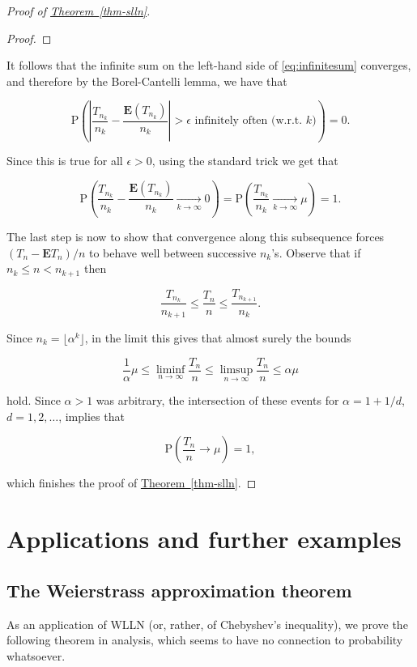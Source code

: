\documentclass[11pt]{report}
\theoremstyle{plain}
\theoremstyle{definition}
\begin{document}
\begin{proof}[Proof of \texorpdfstring{\hyperref[thm-slln]{Theorem~\ref*{thm-slln}}}{Theorem}]
\begin{proof}
\end{proof}

\noindent It follows that the infinite sum on the left-hand
side of \eqref{eq:infinitesum} converges, and therefore by
the Borel-Cantelli lemma, we have that

\[
\mathrm{P}\left(\left|\frac{T_{n_k}}{n_k} - \frac{\mathbf{E}(T_{n_k})}{n_k}\right| > \epsilon\textrm{ infinitely often (w.r.t. } k \textrm{)}\right)
=0.
\]

\noindent Since this is true for all $\epsilon>0$, using the
standard trick we get that

\[
\mathrm{P}\left(\frac{T_{n_k}}{n_k} - \frac{\mathbf{E}(T_{n_k})}{n_k}\xrightarrow[k\to\infty]{}0\right) =
\mathrm{P}\left(\frac{T_{n_k}}{n_k}  \xrightarrow[k\to\infty]{}\mu\right) =  1.
\]

\noindent The last step is now to show that convergence along
this subsequence forces $(T_n-\mathbf{E} T_n)/n$ to
behave well between successive $n_k$'s. Observe that
if $n_k \le n < n_{k+1}$ then

\[
\frac{T_{n_k}}{n_{k+1}} \le \frac{T_n}{n} \le \frac{T_{n_{k+1}}}{n_k}.
\]

\noindent Since $n_k=\lfloor \alpha^k\rfloor$, in the limit
this gives that almost surely the bounds

\[
\frac{1}{\alpha} \mu \le \liminf_{n\to\infty} \frac{T_n}{n} \le \limsup_{n\to\infty} \frac{T_n}{n}
\le \alpha \mu
\]

\noindent hold. Since $\alpha>1$ was arbitrary, the
intersection of these events for $\alpha=1+1/d$,
$d=1,2,\ldots$, implies that

\[
\mathrm{P}\left( \frac{T_n}{n} \to\mu \right) = 1,
\]

\noindent which finishes the proof of \hyperref[thm-slln]{Theorem~\ref*{thm-slln}}.
\end{proof}

\chapter{Applications and further examples}

\section{The Weierstrass approximation theorem}

As an application of WLLN (or, rather, of Chebyshev's
inequality), we prove the following theorem in
analysis, which seems to have no connection to
probability whatsoever.
\end{document}

